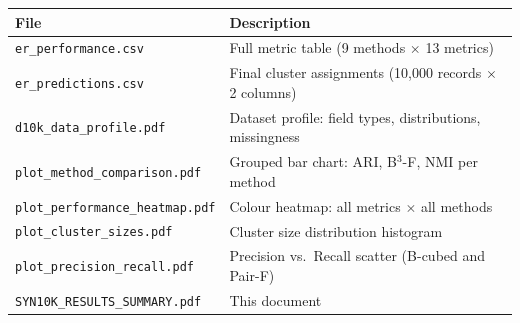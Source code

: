 \documentclass[11pt, a4paper]{article}
\begin{document}
\begin{table}[h!]
\centering
\begin{tabular}{ll}
\toprule
\textbf{File} & \textbf{Description} \\
\midrule
\texttt{er\_performance.csv}          & Full metric table (9 methods $\times$ 13 metrics) \\
\texttt{er\_predictions.csv}          & Final cluster assignments (10,000 records $\times$ 2 columns) \\
\texttt{d10k\_data\_profile.pdf}      & Dataset profile: field types, distributions, missingness \\
\texttt{plot\_method\_comparison.pdf} & Grouped bar chart: ARI, B$^3$-F, NMI per method \\
\texttt{plot\_performance\_heatmap.pdf} & Colour heatmap: all metrics $\times$ all methods \\
\texttt{plot\_cluster\_sizes.pdf}     & Cluster size distribution histogram \\
\texttt{plot\_precision\_recall.pdf}  & Precision vs.\ Recall scatter (B-cubed and Pair-F) \\
\texttt{SYN10K\_RESULTS\_SUMMARY.pdf} & This document \\
\bottomrule
\end{tabular}
\end{table}
\end{document}
